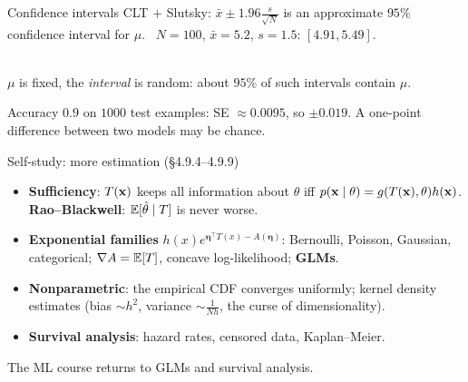 \documentclass[aspectratio=1610,11pt]{beamer}
\begin{document}
\begin{frame}{Confidence intervals}
    \small
    CLT $+$ Slutsky: $\bar x \pm 1.96\frac{s}{\sqrt{N}}$ is an approximate $95\%$ confidence interval for $\mu$. \ $N = 100$, $\bar x = 5.2$, $s = 1.5$: $[4.91, 5.49]$.
    \\[0.3em]
    \centering{}
    \\[0.1em]
    \raggedright
    $\mu$ is fixed, the \emph{interval} is random: about $95\%$ of such intervals contain $\mu$.
    \begin{mlbox}
        \small Accuracy $0.9$ on $1000$ test examples: SE $\approx 0.0095$, so $\pm 0.019$. A one-point difference between two models may be chance.
    \end{mlbox}
\end{frame}

\begin{frame}{Self-study: more estimation (\S4.9.4--4.9.9)}
    \small
    \begin{itemize}
        \item \textbf{Sufficiency}: $T(\mathbf{x})$ keeps all information about $\theta$ iff $p(\mathbf{x} \mid \theta) = g(T(\mathbf{x}), \theta)h(\mathbf{x})$. \textbf{Rao--Blackwell}: $\mathbb{E}[\hat\theta \mid T]$ is never worse.
        \item \textbf{Exponential families} $h(x)e^{\boldsymbol\eta^\top T(x) - A(\boldsymbol\eta)}$: Bernoulli, Poisson, Gaussian, categorical; $\nabla A = \mathbb{E}[T]$, concave log-likelihood; \textbf{GLMs}.
        \item \textbf{Nonparametric}: the empirical CDF converges uniformly; kernel density estimates (bias $\sim h^2$, variance $\sim\frac{1}{Nh}$, the curse of dimensionality).
        \item \textbf{Survival analysis}: hazard rates, censored data, Kaplan--Meier.
    \end{itemize}
    \textcolor{mlcolor}{The ML course returns to GLMs and survival analysis.}
\end{frame}

\end{document}
